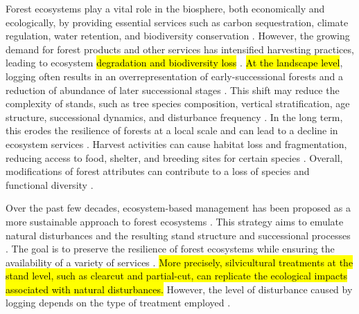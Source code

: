 
Forest ecosystems play a vital role in the biosphere, both economically and ecologically, by providing essential services such as carbon sequestration, climate regulation, water retention, and biodiversity conservation \citep{Balvanera2006Quantifyingevidence,Diaz2006BiodiversityLoss,Canadell2008Managingforests,Pawson2013Plantationforests}. 
However, the growing demand for forest products and other services has intensified harvesting practices, leading to ecosystem \hl{degradation and biodiversity loss} \citep{Bengtsson2000Biodiversitydisturbances,Sala2000Globalbiodiversity,Foley2005GlobalConsequences,Naeem2012functionsbiological}. 
\hl{At the landscape level}, logging often results in an overrepresentation of early-successional forests and a reduction of abundance of later successional stages \citep{Cyr2009Forestmanagement,Boucher2017Cumulativepatterns}. 
This shift may reduce the complexity of stands, such as tree species composition, vertical stratification, age structure, successional dynamics, and disturbance frequency \citep{Bergeron2000Speciesstand,Commarmot2005Structurevirgin,Varga2005Treesizediversity}. 
In the long term, this erodes the resilience of forests at a local scale and can lead to a decline in ecosystem services \citep{Hooper2012globalsynthesis,Edwards2014Maintainingecosystem}. 
Harvest activities can cause habitat loss and fragmentation, reducing access to food, shelter, and breeding sites for certain species \citep{Bouderbala2023Longtermeffect}. 
Overall, modifications of forest attributes can contribute to a loss of species and functional diversity \citep{Saccheri1998Inbreedingextinction}. 

Over the past few decades, ecosystem-based management has been proposed as a more sustainable approach to forest ecosystems \citep{Perry1998scientificbasis,Kuuluvainen2002Naturalvariabilitya}. 
This strategy aims to emulate natural disturbances and the resulting stand structure and successional processes \citep{Bergeron1999Forestmanagementa}. 
The goal is to preserve the resilience of forest ecosystems while ensuring the availability of a variety of services \citep{Szaro1998emergenceecosystem,MacDicken2015Globalprogress}. 
\hl{More precisely, silvicultural treatments at the stand level, such as clearcut and partial-cut, can replicate the ecological impacts associated with natural disturbances. }
However, the level of disturbance caused by logging depends on the type of treatment employed \citep{Harpole1999Effectsseven,Chaudhary2016Impactforest,Koivula2019Responsesboreal}. 

